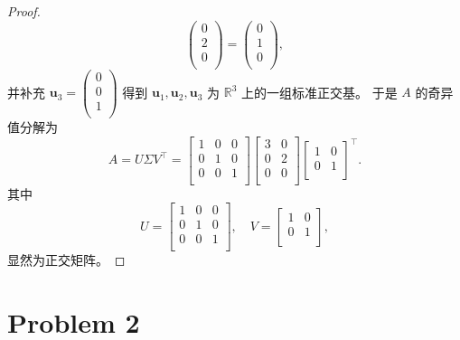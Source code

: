 \begin{proof}
\[\begin{pmatrix}
        0 \\
        2 \\
        0 \\
    \end{pmatrix} = \begin{pmatrix}
        0 \\
        1 \\
        0 \\
    \end{pmatrix},
    \]
    并补充 $\boldsymbol{u}_3 = \begin{pmatrix}
        0 \\
        0 \\
        1 \\
    \end{pmatrix}$ 得到 $\boldsymbol{u}_1, \boldsymbol{u}_2, \boldsymbol{u}_3$ 为 $\mathbb{R}^3$ 上的一组标准正交基。
    于是 $A$ 的奇异值分解为 \[
A = U \Sigma V^\top = \begin{bmatrix}
    1 & 0 & 0 \\
    0 & 1 & 0 \\
    0 & 0 & 1 \\
\end{bmatrix} \begin{bmatrix}
    3 & 0 \\
    0 & 2 \\
    0 & 0 \\
\end{bmatrix} \begin{bmatrix}
    1 & 0 \\
    0 & 1 \\
\end{bmatrix}^\top.
    \]
    其中 \[
    U = \begin{bmatrix}
        1 & 0 & 0 \\
        0 & 1 & 0 \\
        0 & 0 & 1 \\
    \end{bmatrix}, \quad V = \begin{bmatrix}
        1 & 0 \\
        0 & 1 \\
    \end{bmatrix},
    \]
    显然为正交矩阵。
\end{proof}

\section*{Problem 2}

